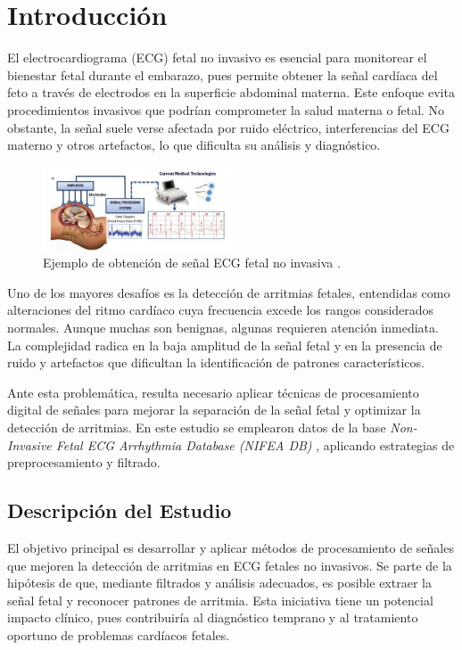 \documentclass[10pt, conference]{IEEEtran}
\begin{document}
\section{Introducción}

El electrocardiograma (ECG) fetal no invasivo es esencial para monitorear el bienestar fetal durante el embarazo, pues permite obtener la señal cardíaca del feto a través de electrodos en la superficie abdominal materna. Este enfoque evita procedimientos invasivos que podrían comprometer la salud materna o fetal. No obstante, la señal suele verse afectada por ruido eléctrico, interferencias del ECG materno y otros artefactos, lo que dificulta su análisis y diagnóstico.

\begin{figure}[htbp]
	\centerline{\includegraphics[width=0.5\textwidth]{The-fetal-ECG-monitoring-a-Non-invasive.jpg}}
	\caption{Ejemplo de obtención de señal ECG fetal no invasiva \cite{sensors2022}.}
	\label{fig:fetal_ecg}
\end{figure}

Uno de los mayores desafíos es la detección de arritmias fetales, entendidas como alteraciones del ritmo cardíaco cuya frecuencia excede los rangos considerados normales. Aunque muchas son benignas, algunas requieren atención inmediata. La complejidad radica en la baja amplitud de la señal fetal y en la presencia de ruido y artefactos que dificultan la identificación de patrones característicos.

Ante esta problemática, resulta necesario aplicar técnicas de procesamiento digital de señales para mejorar la separación de la señal fetal y optimizar la detección de arritmias. En este estudio se emplearon datos de la base \textit{Non-Invasive Fetal ECG Arrhythmia Database (NIFEA DB)} \cite{behar2019noninvasive}, aplicando estrategias de preprocesamiento y filtrado.

\subsection{Descripción del Estudio}

El objetivo principal es desarrollar y aplicar métodos de procesamiento de señales que mejoren la detección de arritmias en ECG fetales no invasivos. Se parte de la hipótesis de que, mediante filtrados y análisis adecuados, es posible extraer la señal fetal y reconocer patrones de arritmia. Esta iniciativa tiene un potencial impacto clínico, pues contribuiría al diagnóstico temprano y al tratamiento oportuno de problemas cardíacos fetales.
\end{document}
